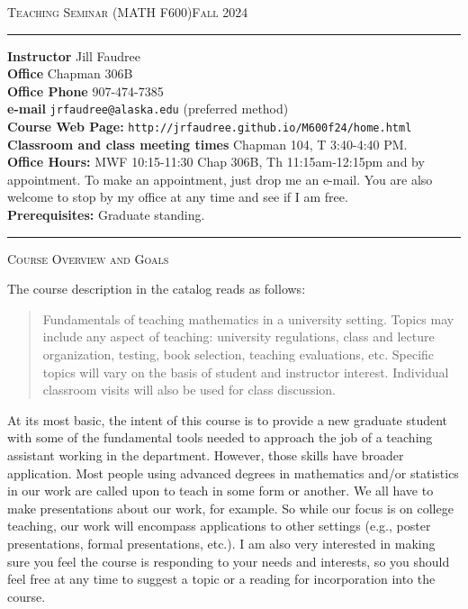 \documentclass[12pt]{article}
\begin{document}
\normalem
\begin{center}
 \textsc{Teaching Seminar (MATH F600)\hfill Fall 2024}
\end{center}

\rule{\textwidth}{.1pt}

\textbf{Instructor} Jill Faudree\\
\textbf{Office} Chapman 306B\\
\textbf{Office Phone} 907-474-7385\\
\textbf{e-mail} {\tt jrfaudree@alaska.edu} (preferred method)\\
\textbf{Course Web Page:} {\tt http://jrfaudree.github.io/M600f24/home.html}\\
\textbf{Classroom and class meeting times} Chapman 104, T 3:40-4:40 PM. \\
\textbf{Office Hours:}  MWF 10:15-11:30 Chap 306B, Th 11:15am-12:15pm and by appointment. To make an appointment, just drop me an e-mail. You are also welcome to stop by my office at any time and see if I am free.\\
\textbf{Prerequisites:} Graduate standing.

\rule{\textwidth}{.1pt}  

\textsc{Course Overview and Goals} 

The course description in the catalog reads as follows:
\begin{quote}Fundamentals of teaching mathematics in a university setting. Topics may include any aspect of teaching: university regulations, class and lecture organization, testing, book selection, teaching evaluations, etc. Specific topics will vary on the basis of student and instructor interest. Individual classroom visits will also be used for class discussion.\end{quote}
At its most basic, the intent of this course is to provide a new graduate student with some of the fundamental tools needed to approach the job of a teaching assistant working in the department. However, those skills have broader application. Most people using advanced degrees in mathematics and/or statistics in our work are called upon to teach in some form or another. We all have to make presentations about our work, for example. So while our focus is on college teaching, our work will encompass  applications to other settings (e.g., poster presentations, formal presentations, etc.). I am also very interested in making sure you feel the course is responding to your needs and interests, so you should feel free at any time to suggest a topic or a reading for incorporation into the course.
 
\end{document}
